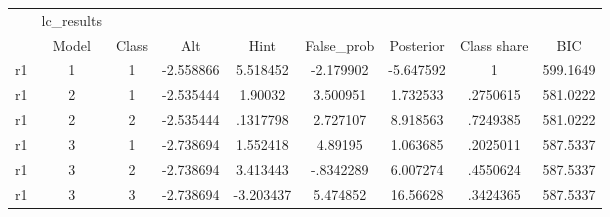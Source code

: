 \begin{tabular}{l*{8}{c}}
\hline\hline
            &  lc\_results&            &            &            &            &            &            &            \\
            &       Model&       Class&         Alt&        Hint&  False\_prob&   Posterior& Class share&         BIC\\
\hline
r1          &           1&           1&   -2.558866&    5.518452&   -2.179902&   -5.647592&           1&    599.1649\\
r1          &           2&           1&   -2.535444&     1.90032&    3.500951&    1.732533&    .2750615&    581.0222\\
r1          &           2&           2&   -2.535444&    .1317798&    2.727107&    8.918563&    .7249385&    581.0222\\
r1          &           3&           1&   -2.738694&    1.552418&     4.89195&    1.063685&    .2025011&    587.5337\\
r1          &           3&           2&   -2.738694&    3.413443&   -.8342289&    6.007274&    .4550624&    587.5337\\
r1          &           3&           3&   -2.738694&   -3.203437&    5.474852&    16.56628&    .3424365&    587.5337\\
\hline\hline
\end{tabular}
